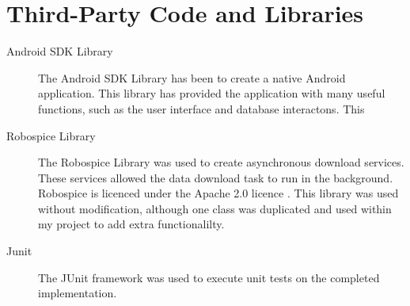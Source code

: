 \chapter{Third-Party Code and Libraries}
\begin{description}
\item[Android SDK Library]
The Android SDK Library \cite{android_sdk} has been to create a native Android application. This library has provided the application with many useful functions, such as the user interface and database interactons. This 

\item[Robospice Library]
The Robospice Library \cite{robospice} was used to create asynchronous download services. These services allowed the data download task to run in the background. Robospice is licenced under the Apache 2.0 licence \cite{apache_licence}. This library was used without modification, although one class was duplicated and used within my project to add extra functionalilty.

\item[Junit]
The JUnit framework \cite{junit} was used to execute unit tests on the completed implementation.
\end{description}